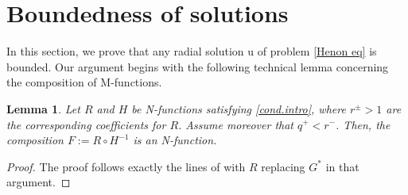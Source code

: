 \documentclass[leqno,twoside, 12pt]{amsart}
\theoremstyle{plain}
\numberwithin{equation}{section} \numberwithin{figure}{section}
\newtheorem{lemma}[theorem]{Lemma}
\theoremstyle{definition}
\numberwithin{equation}{section}
\begin{document}
%


\section{Boundedness of solutions} \label{sec.bound}
 
In this section, we prove that any radial solution 
u of problem \eqref{Henon eq} is bounded. Our argument begins with the following technical lemma concerning the composition of M-functions.

\begin{lemma}\label{F function}Let $R$ and $H$ be N-functions satisfying \eqref{cond.intro}, where $r^{\pm}>1$ are the corresponding coefficients for $R$. Assume moreover that $q^{+}< r^{-}$. Then, the composition  $F:=R\circ H^{-1}$ is an N-function. 
\end{lemma}
\begin{proof}
The proof follows exactly the lines of \cite[Lemma 8]{FSV} with $R$ replacing $G^{*}$ in that argument.
\end{proof}
\end{document}
